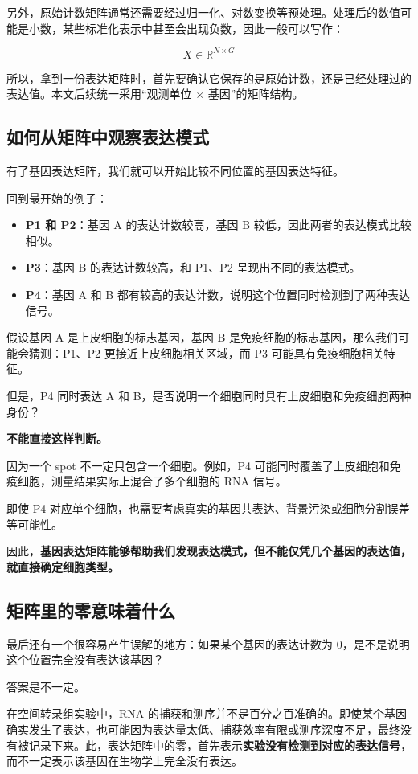 \documentclass[UTF8,a4paper,11pt,fontset=fandol]{ctexart}
\begin{document}
另外，原始计数矩阵通常还需要经过归一化、对数变换等预处理。处理后的数值可能是小数，某些标准化表示中甚至会出现负数，因此一般可以写作：

\[
  X\in\mathbb{R}^{N\times G}
\]

所以，拿到一份表达矩阵时，首先要确认它保存的是原始计数，还是已经处理过的表达值。本文后续统一采用“观测单位 $\times$ 基因”的矩阵结构。

\subsection{如何从矩阵中观察表达模式}

有了基因表达矩阵，我们就可以开始比较不同位置的基因表达特征。

回到最开始的例子：

\begin{itemize}
  \item \textbf{P1 和 P2}：基因 A 的表达计数较高，基因 B 较低，因此两者的表达模式比较相似。
  \item \textbf{P3}：基因 B 的表达计数较高，和 P1、P2 呈现出不同的表达模式。
  \item \textbf{P4}：基因 A 和 B 都有较高的表达计数，说明这个位置同时检测到了两种表达信号。
\end{itemize}

假设基因 A 是上皮细胞的标志基因，基因 B 是免疫细胞的标志基因，那么我们可能会猜测：P1、P2 更接近上皮细胞相关区域，而 P3 可能具有免疫细胞相关特征。

但是，P4 同时表达 A 和 B，是否说明一个细胞同时具有上皮细胞和免疫细胞两种身份？

\textbf{不能直接这样判断。}

因为一个 spot 不一定只包含一个细胞。例如，P4 可能同时覆盖了上皮细胞和免疫细胞，测量结果实际上混合了多个细胞的 RNA 信号。

即使 P4 对应单个细胞，也需要考虑真实的基因共表达、背景污染或细胞分割误差等可能性。

因此，\textbf{基因表达矩阵能够帮助我们发现表达模式，但不能仅凭几个基因的表达值，就直接确定细胞类型。}

\subsection{矩阵里的零意味着什么}

最后还有一个很容易产生误解的地方：如果某个基因的表达计数为 0，是不是说明这个位置完全没有表达该基因？

答案是不一定。

在空间转录组实验中，RNA 的捕获和测序并不是百分之百准确的。即使某个基因确实发生了表达，也可能因为表达量太低、捕获效率有限或测序深度不足，最终没有被记录下来。此，表达矩阵中的零，首先表示\textbf{实验没有检测到对应的表达信号}，而不一定表示该基因在生物学上完全没有表达。
\end{document}
